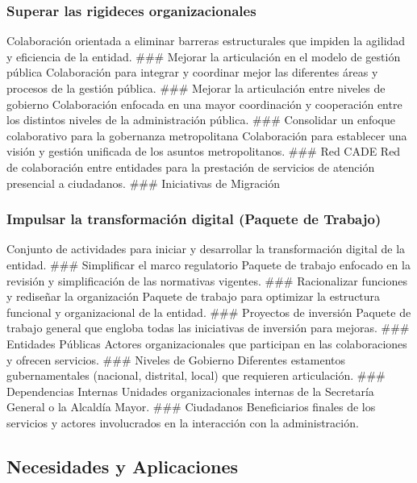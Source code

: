 \documentclass[
	a4paper, %
	12pt, %
]{include/CSSullivanBusinessReport}
\begin{document}
\subsubsection{Superar las rigideces
organizacionales}\label{sec:superar-las-rigideces-organizacionales}

Colaboración orientada a eliminar barreras estructurales que impiden la
agilidad y eficiencia de la entidad. \#\#\# Mejorar la articulación en
el modelo de gestión pública Colaboración para integrar y coordinar
mejor las diferentes áreas y procesos de la gestión pública. \#\#\#
Mejorar la articulación entre niveles de gobierno Colaboración enfocada
en una mayor coordinación y cooperación entre los distintos niveles de
la administración pública. \#\#\# Consolidar un enfoque colaborativo
para la gobernanza metropolitana Colaboración para establecer una visión
y gestión unificada de los asuntos metropolitanos. \#\#\# Red CADE Red
de colaboración entre entidades para la prestación de servicios de
atención presencial a ciudadanos. \#\#\# Iniciativas de Migración

\subsubsection{Impulsar la transformación digital (Paquete de
Trabajo)}\label{sec:impulsar-la-transformaciuxf3n-digital-paquete-de-trabajo}

Conjunto de actividades para iniciar y desarrollar la transformación
digital de la entidad. \#\#\# Simplificar el marco regulatorio Paquete
de trabajo enfocado en la revisión y simplificación de las normativas
vigentes. \#\#\# Racionalizar funciones y rediseñar la organización
Paquete de trabajo para optimizar la estructura funcional y
organizacional de la entidad. \#\#\# Proyectos de inversión Paquete de
trabajo general que engloba todas las iniciativas de inversión para
mejoras. \#\#\# Entidades Públicas Actores organizacionales que
participan en las colaboraciones y ofrecen servicios. \#\#\# Niveles de
Gobierno Diferentes estamentos gubernamentales (nacional, distrital,
local) que requieren articulación. \#\#\# Dependencias Internas Unidades
organizacionales internas de la Secretaría General o la Alcaldía Mayor.
\#\#\# Ciudadanos Beneficiarios finales de los servicios y actores
involucrados en la interacción con la administración.

\subsection{Necesidades y
Aplicaciones}\label{sec:necesidades-y-aplicaciones}
\end{document}
